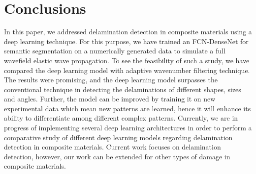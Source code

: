 \section{Conclusions}
In this paper, we addressed delamination detection in composite materials using a deep learning technique. 
For this purpose, we have trained an FCN-DenseNet for semantic segmentation on a numerically generated data to simulate a full wavefield elastic wave propagation.
To see the feasibility of such a study, we have compared the deep learning model with adaptive wavenumber filtering technique.
The results were promising, and the deep learning model surpasses the conventional technique in detecting the delaminations of different shapes, sizes and angles. 
Further, the model can be improved by training it on new experimental data which mean new patterns are learned, hence it will enhance its ability to differentiate among different complex patterns.
Currently, we are in progress of implementing several deep learning architectures in order to perform a comparative study of different deep learning models regarding delamination detection in composite materials.
Current work focuses on delamination detection, however, our work can be extended for other types of damage in composite materials.